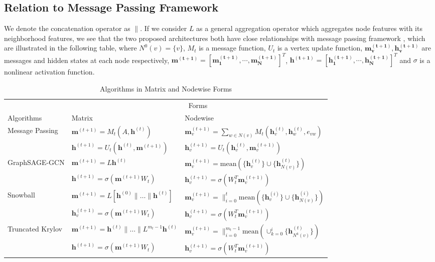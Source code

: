 \documentclass{article}
\begin{document}
\subsection{Relation to Message Passing Framework}
We denote the concatenation operator as $\|$. If we consider $L$ as a general aggregation operator which aggregates node features with its neighborhood features, we see that the two proposed architectures both have close relationships with message passing framework \cite{gilmer2017neural}, which are illustrated in the following table, where $N^0(v) = \{v\}$, $M_t$ is a message function,
$U_t$ is a vertex update function, $\bm{m_v^{(t+1)}}, \bm{h_v^{(t+1)}}$ are messages and hidden states at each node respectively, $\bm{m^{(t+1)}} = [\bm{m_1^{(t+1)}}, \cdots, \bm{m_N^{(t+1)}}]^T$,  $\bm{h^{(t+1)}} = [\bm{h_1^{(t+1)}}, \cdots, \bm{h_N^{(t+1)}}]^T$ and $\sigma$ is a nonlinear activation function.%
\begin{table}[htbp]
  \caption{Algorithms in Matrix and Nodewise Forms}
  \label{sample-table}
  \centering
  \begin{tabular}{lll}
    \toprule
    & \multicolumn{2}{c}{Forms}                   \\
    \cmidrule(r){2-3}
    Algorithms     & Matrix     & Nodewise \\
    \midrule
    \multirow{2}[0]{*}{Message Passing} & $\bm{m}^{(t+1)} = M_t(A,\bm{h}^{(t)})$  & $\bm{m}_v^{(t+1)} = \sum\limits_{w \in N(v)}M_t(\bm{h}_v^{(t)}, \bm{h}_w^{(t)}, e_{vw})$     \\
                   & $\bm{h}^{(t+1)} = U_t(\bm{h}^{(t)},\bm{m}^{(t+1)})$  & $\bm{h}_v^{(t+1)} = U_t(\bm{h}_v^{(t)}, \bm{m}_v^{(t+1)})$     \\
    \midrule
    \multirow{2}[0]{*}{GraphSAGE-GCN} & $\bm{m}^{(t+1)} = L \bm{h}^{(t)}$ &   $\bm{m}_v^{(t+1)} = \text{mean}(\{\bm{h}_v^{(t)}\} \cup \{\bm{h}_{N(v)}^{(t)} \})$     \\
         & $\bm{h}^{(t+1)} = \sigma(
         \bm{m}^{(t+1)}W_t)$  & $\bm{h}_v^{(t+1)} = \sigma(W_t^T \bm{m}_v^{(t+1)})$     \\
    \midrule
    \multirow{2}[0]{*}{Snowball}  & $\bm{m}^{(t+1)} = L [\bm{h}^{(0)} \| \dots \| \bm{h}^{(t)}]$ & $\bm{m}_v^{(t+1)} = \|_{i=0}^t \text{mean}(\{\bm{h}_v^{(i)}\} \cup \{\bm{h}_{N(v)}^{(i)} \})$  \\
          & $\bm{h}_v^{(t+1)} = \sigma(\bm{m}^{(t+1)}W_t)$ & $\bm{h}_v^{(t+1)} = \sigma(W_t^T \bm{m}_v^{(t+1)})$    \\
    \midrule
    \multirow{2}[0]{*}{Truncated Krylov} & $\bm{m}^{(t+1)} = \bm{h}^{(t)} \| \dots \| L^{m_t-1} \bm{h}^{(t)}$       & $\bm{m}_v^{(t+1)} = \|_{i=0}^{m_t-1} \text{mean}(\cup_{k=0}^{i} \{\bm{h}_{N^k(v)}^{(t)} \})$   \\
          & $\bm{h}^{(t+1)} = \sigma(\bm{m}^{(t+1)} W_t)$ & $\bm{h}_v^{(t+1)} = \sigma(W_t^T \bm{m}_v^{(t+1)})$      \\
    \bottomrule
  \end{tabular}
\end{table}
\end{document}
